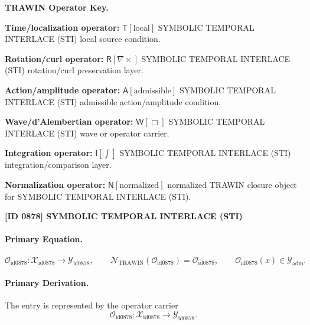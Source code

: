 \par\vspace{0.45\baselineskip}
\noindent\begin{minipage}[t]{\linewidth}
\begingroup
\small
\raggedright
\textbf{TRAWIN Operator Key.}\par
\noindent\textbf{Time/localization operator:} $\mathsf{T}\!\left[\mathrm{local}\right]$ SYMBOLIC TEMPORAL INTERLACE (STI) local source condition.\par
\noindent\textbf{Rotation/curl operator:} $\mathsf{R}\!\left[\nabla\times\right]$ SYMBOLIC TEMPORAL INTERLACE (STI) rotation/curl preservation layer.\par
\noindent\textbf{Action/amplitude operator:} $\mathsf{A}\!\left[\mathrm{admissible}\right]$ SYMBOLIC TEMPORAL INTERLACE (STI) admissible action/amplitude condition.\par
\noindent\textbf{Wave/d'Alembertian operator:} $\mathsf{W}\!\left[\Box\right]$ SYMBOLIC TEMPORAL INTERLACE (STI) wave or operator carrier.\par
\noindent\textbf{Integration operator:} $\mathsf{I}\!\left[\int\right]$ SYMBOLIC TEMPORAL INTERLACE (STI) integration/comparison layer.\par
\noindent\textbf{Normalization operator:} $\mathsf{N}\!\left[\mathrm{normalized}\right]$ normalized TRAWIN closure object for SYMBOLIC TEMPORAL INTERLACE (STI).\par
\endgroup
\end{minipage}

\clearpage
\noindent\textbf{[ID 0878] SYMBOLIC TEMPORAL INTERLACE (STI)}\par
\vspace{0.35em}
\paragraph{Primary Equation.}
\[
\mathcal{O}_{\mathrm{id0878}}:\mathcal{X}_{\mathrm{id0878}}\longrightarrow \mathcal{Y}_{\mathrm{id0878}},\qquad
\mathcal{N}_{\mathrm{TRAWIN}}(\mathcal{O}_{\mathrm{id0878}})=\mathcal{O}_{\mathrm{id0878}},\qquad
\mathcal{O}_{\mathrm{id0878}}(x)\in\mathcal{Y}_{\mathrm{adm}}.
\]

\paragraph{Primary Derivation.} The entry is represented by the operator carrier\[
\mathcal{O}_{\mathrm{id0878}}:\mathcal{X}_{\mathrm{id0878}}\longrightarrow \mathcal{Y}_{\mathrm{id0878}}.
\]

